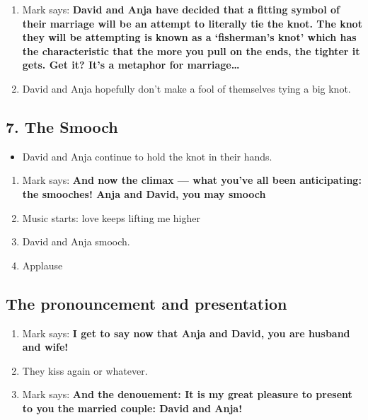 \begin{enumerate}
\def\labelenumi{\arabic{enumi}.}
\tightlist
\item
  Mark says: \textbf{David and Anja have decided that a fitting symbol
  of their marriage will be an attempt to literally tie the knot. The
  knot they will be attempting is known as a `fisherman's knot' which
  has the characteristic that the more you pull on the ends, the tighter
  it gets. Get it? It's a metaphor for marriage\ldots{}}
\item
  David and Anja hopefully don't make a fool of themselves tying a big
  knot.
\end{enumerate}

\hypertarget{the-smooch}{%
\subsection{7. The Smooch}\label{the-smooch}}

\begin{itemize}
\tightlist
\item
  David and Anja continue to hold the knot in their hands.
\end{itemize}

\begin{enumerate}
\def\labelenumi{\arabic{enumi}.}
\tightlist
\item
  Mark says: \textbf{And now the climax --- what you've all been
  anticipating: the smooches! Anja and David, you may smooch}
\item
  Music starts: love keeps lifting me higher
\item
  David and Anja smooch.
\item
  Applause
\end{enumerate}

\hypertarget{the-pronouncement-and-presentation}{%
\subsection{The pronouncement and
presentation}\label{the-pronouncement-and-presentation}}

\begin{enumerate}
\def\labelenumi{\arabic{enumi}.}
\tightlist
\item
  Mark says: \textbf{I get to say now that Anja and David, you are
  husband and wife!}
\item
  They kiss again or whatever.
\item
  Mark says: \textbf{And the denouement: It is my great pleasure to
  present to you the married couple: David and Anja!}
\end{enumerate}


